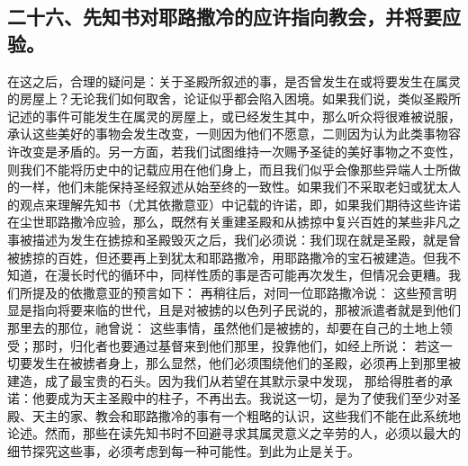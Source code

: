 
\subsection{二十六、先知书对耶路撒冷的应许指向教会，并将要应验。}

在这之后，合理的疑问是：关于圣殿所叙述的事，是否曾发生在或将要发生在属灵的房屋上？无论我们如何取舍，论证似乎都会陷入困境。如果我们说，类似圣殿所记述的事件可能发生在属灵的房屋上，或已经发生其中，那么听众将很难被说服，承认这些美好的事物会发生改变，一则因为他们不愿意，二则因为认为此类事物容许改变是矛盾的。另一方面，若我们试图维持一次赐予圣徒的美好事物之不变性，则我们不能将历史中的记载应用在他们身上，而且我们似乎会像那些异端人士所做的一样，他们未能保持圣经叙述从始至终的一致性。如果我们不采取老妇或犹太人的观点来理解先知书（尤其依撒意亚）中记载的许诺，即，如果我们期待这些许诺在尘世耶路撒冷应验，那么，既然有关重建圣殿和从掳掠中复兴百姓的某些非凡之事被描述为发生在掳掠和圣殿毁灭之后，我们必须说：我们现在就是圣殿，就是曾被掳掠的百姓，但还要再上到犹太和耶路撒冷，用耶路撒冷的宝石被建造。但我不知道，在漫长时代的循环中，同样性质的事是否可能再次发生，但情况会更糟。我们所提及的依撒意亚的预言如下：  再稍往后，对同一位耶路撒冷说：  这些预言明显是指向将要来临的世代，且是对被掳的以色列子民说的，那被派遣者就是到他们那里去的那位，祂曾说：  这些事情，虽然他们是被掳的，却要在自己的土地上领受；那时，归化者也要通过基督来到他们那里，投靠他们，如经上所说：  若这一切要发生在被掳者身上，那么显然，他们必须围绕他们的圣殿，必须再上到那里被建造，成了最宝贵的石头。因为我们从若望在其默示录中发现， 那给得胜者的承诺：他要成为天主圣殿中的柱子，不再出去。我说这一切，是为了使我们至少对圣殿、天主的家、教会和耶路撒冷的事有一个粗略的认识，这些我们不能在此系统地论述。然而，那些在读先知书时不回避寻求其属灵意义之辛劳的人，必须以最大的细节探究这些事，必须考虑到每一种可能性。到此为止是关于。\par


